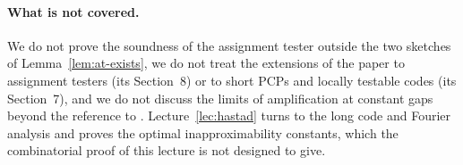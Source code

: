 \paragraph{What is not covered.}
We do not prove the soundness of the assignment tester outside the two sketches of Lemma~\ref{lem:at-exists}, we do not treat the extensions of the paper to assignment testers (its Section~8) or to short PCPs and locally testable codes (its Section~7), and we do not discuss the limits of amplification at constant gaps beyond the reference to \citet{Bogdanov05}.
Lecture~\ref{lec:hastad} turns to the long code and Fourier analysis and proves the optimal inapproximability constants, which the combinatorial proof of this lecture is not designed to give.
